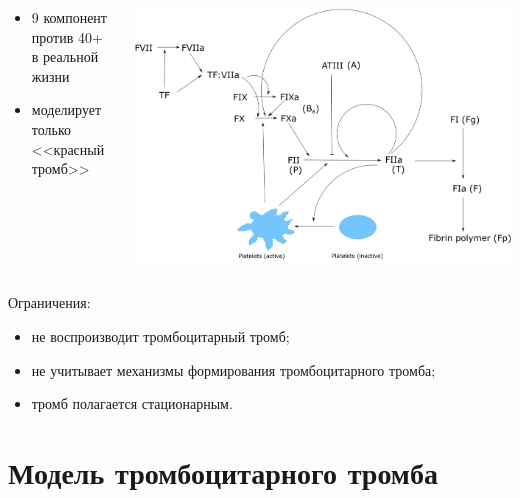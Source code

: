 \documentclass[
    14pt,
    xcolor=dvipsnames,
    aspectratio=169
]{beamer}
\begin{document}
\begin{frame}{\secname}
    \begin{columns}[T]
        \begin{column}{0.4\textwidth}
           \begin{itemize}
               \item 9 компонент против 40+ в реальной жизни
               \item моделирует только <<красный тромб>>
           \end{itemize}
        \end{column}
        \begin{column}{0.6\textwidth}
            \centering
            \includegraphics[width=1.0\textwidth]{./images/slides/model.png}
        \end{column}
    \end{columns}
\end{frame}

\begin{frame}{\secname}
    Ограничения:
    \begin{itemize}
        \item не воспроизводит тромбоцитарный тромб;
        \item не учитывает механизмы формирования тромбоцитарного тромба;
        \item тромб полагается стационарным.
    \end{itemize}
\end{frame}


\section{Модель тромбоцитарного тромба}
\end{document}
